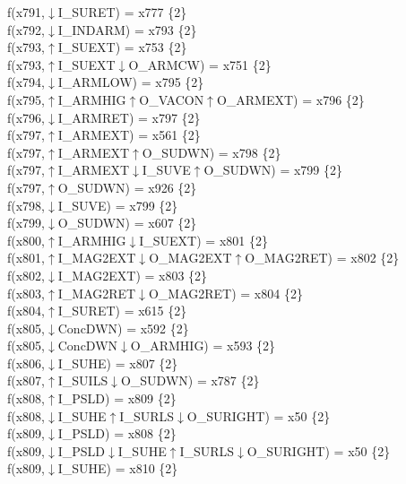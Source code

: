 f(x791,$\downarrow$I\_SURET) = x777 \{2\} \\  
f(x792,$\downarrow$I\_INDARM) = x793 \{2\} \\  
f(x793,$\uparrow$I\_SUEXT) = x753 \{2\} \\  
f(x793,$\uparrow$I\_SUEXT$\downarrow$O\_ARMCW) = x751 \{2\} \\  
f(x794,$\downarrow$I\_ARMLOW) = x795 \{2\} \\  
f(x795,$\uparrow$I\_ARMHIG$\uparrow$O\_VACON$\uparrow$O\_ARMEXT) = x796 \{2\} \\  
f(x796,$\downarrow$I\_ARMRET) = x797 \{2\} \\  
f(x797,$\uparrow$I\_ARMEXT) = x561 \{2\} \\  
f(x797,$\uparrow$I\_ARMEXT$\uparrow$O\_SUDWN) = x798 \{2\} \\  
f(x797,$\uparrow$I\_ARMEXT$\downarrow$I\_SUVE$\uparrow$O\_SUDWN) = x799 \{2\} \\  
f(x797,$\uparrow$O\_SUDWN) = x926 \{2\} \\  
f(x798,$\downarrow$I\_SUVE) = x799 \{2\} \\  
f(x799,$\downarrow$O\_SUDWN) = x607 \{2\} \\  
f(x800,$\uparrow$I\_ARMHIG$\downarrow$I\_SUEXT) = x801 \{2\} \\  
f(x801,$\uparrow$I\_MAG2EXT$\downarrow$O\_MAG2EXT$\uparrow$O\_MAG2RET) = x802 \{2\} \\  
f(x802,$\downarrow$I\_MAG2EXT) = x803 \{2\} \\  
f(x803,$\uparrow$I\_MAG2RET$\downarrow$O\_MAG2RET) = x804 \{2\} \\  
f(x804,$\uparrow$I\_SURET) = x615 \{2\} \\  
f(x805,$\downarrow$ConcDWN) = x592 \{2\} \\  
f(x805,$\downarrow$ConcDWN$\downarrow$O\_ARMHIG) = x593 \{2\} \\  
f(x806,$\downarrow$I\_SUHE) = x807 \{2\} \\  
f(x807,$\uparrow$I\_SUILS$\downarrow$O\_SUDWN) = x787 \{2\} \\  
f(x808,$\uparrow$I\_PSLD) = x809 \{2\} \\  
f(x808,$\downarrow$I\_SUHE$\uparrow$I\_SURLS$\downarrow$O\_SURIGHT) = x50 \{2\} \\  
f(x809,$\downarrow$I\_PSLD) = x808 \{2\} \\  
f(x809,$\downarrow$I\_PSLD$\downarrow$I\_SUHE$\uparrow$I\_SURLS$\downarrow$O\_SURIGHT) = x50 \{2\} \\  
f(x809,$\downarrow$I\_SUHE) = x810 \{2\} \\  
